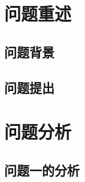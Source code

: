 \documentclass{MathorCupmodeling}
\begin{document}


\begin{abstract}


\end{abstract}

\mulu

\section{问题重述}
\subsection{问题背景}

\subsection{问题提出}

\section{问题分析}

\subsection{问题一的分析}
\end{document}
